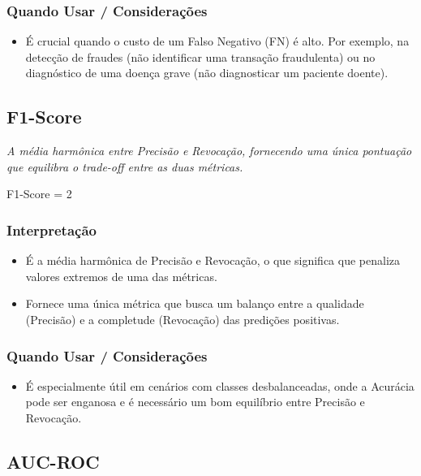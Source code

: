 \subsubsection*{Quando Usar / Considerações}
\begin{itemize}
    \item É crucial quando o custo de um Falso Negativo (FN) é alto. Por exemplo, na detecção de fraudes (não identificar uma transação fraudulenta) ou no diagnóstico de uma doença grave (não diagnosticar um paciente doente).
\end{itemize}

\subsection{F1-Score}

\textit{A média harmônica entre Precisão e Revocação, fornecendo uma única pontuação que equilibra o trade-off entre as duas métricas.}

\begin{equacaodestaque}{F1-Score}
     = 2 \times {}
\end{equacaodestaque}

\subsubsection*{Interpretação}
\begin{itemize}
    \item É a média harmônica de Precisão e Revocação, o que significa que penaliza valores extremos de uma das métricas.
    \item Fornece uma única métrica que busca um balanço entre a qualidade (Precisão) e a completude (Revocação) das predições positivas.
\end{itemize}

\subsubsection*{Quando Usar / Considerações}
\begin{itemize}
    \item É especialmente útil em cenários com classes desbalanceadas, onde a Acurácia pode ser enganosa e é necessário um bom equilíbrio entre Precisão e Revocação.
\end{itemize}

\subsection{AUC-ROC}

